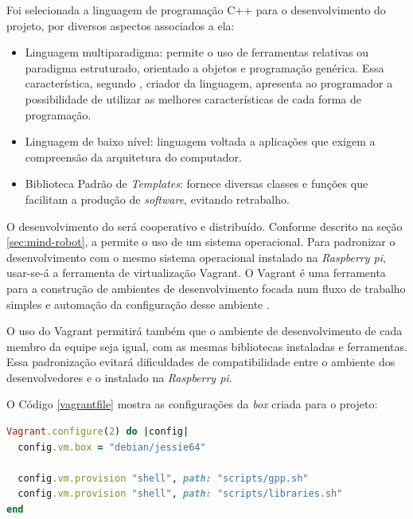 \FloatBarrier
\par
Foi selecionada a linguagem de programação \textsf{C++} para o desenvolvimento
do projeto, por diversos aspectos associados a ela:
\begin{itemize}
  \item Linguagem multiparadigma: permite o uso de ferramentas relativas
  ou paradigma estruturado, orientado a objetos e programação genérica. Essa
  característica, segundo , criador da linguagem, apresenta
  ao programador a possibilidade de utilizar as melhores características de
  cada forma de programação.
  
  \item Linguagem de baixo nível: linguagem voltada a aplicações que exigem
  a compreensão da arquitetura do computador.
  
  \item Biblioteca Padrão de \textit{Templates}: fornece diversas classes e
  funções que facilitam a produção de \textit{software}, evitando retrabalho.
\end{itemize}
\par
O desenvolvimento do \software será cooperativo e distribuído. Conforme descrito na
seção \ref{sec:mind-robot}, a \rasp permite o uso de um sistema operacional. Para
padronizar o desenvolvimento com o mesmo sistema operacional instalado na
\textit{Raspberry pi}, usar-se-á a ferramenta de virtualização \textsf{Vagrant}.
O \textsf{Vagrant} é uma ferramenta para a construção de ambientes de desenvolvimento
focada num fluxo de trabalho simples e automação da configuração desse ambiente
\cite{hashicorp2016}.
\par
O uso do \textsf{Vagrant} permitirá também que o ambiente de desenvolvimento de
cada membro da equipe seja igual, com as mesmas bibliotecas instaladas e ferramentas.
Essa padronização evitará dificuldades de compatibilidade entre o ambiente dos
desenvolvedores e o instalado na \textit{Raspberry pi}.
\par
O Código \ref{vagrantfile} mostra as configurações da \textit{box} criada para o
projeto:
\par
\begin{lstlisting}[language=Ruby, label=vagrantfile, caption=\textsf{Vagrantfile} inicial]
Vagrant.configure(2) do |config|
  config.vm.box = "debian/jessie64"

  config.vm.provision "shell", path: "scripts/gpp.sh"
  config.vm.provision "shell", path: "scripts/libraries.sh"
end
\end{lstlisting}
